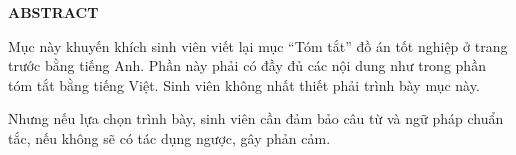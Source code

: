 \documentclass[../LuanVan.tex]{subfiles}
\begin{document}
\begin{center}
    \Large{\textbf{ABSTRACT}}\\
\end{center}
\vspace{1cm}
Mục này khuyến khích sinh viên viết lại mục “Tóm tắt” đồ án tốt nghiệp ở trang trước bằng tiếng Anh. Phần này phải có đầy đủ các nội dung như trong phần tóm tắt bằng tiếng Việt.
Sinh viên không nhất thiết phải trình bày mục này. 

Nhưng nếu lựa chọn trình bày, sinh viên cần đảm bảo câu từ và ngữ pháp chuẩn tắc, nếu không sẽ có tác dụng ngược, gây phản cảm.
\end{document}

